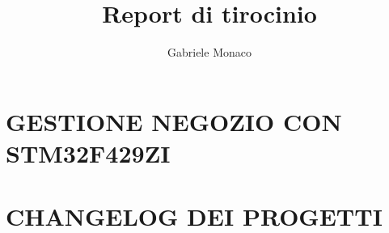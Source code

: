 \documentclass[a4paper,12pt]{article}
\title{Report di tirocinio}
\author{Gabriele Monaco}
\begin{document}
\maketitle

\newpage

\tableofcontents

\setlength{\parindent}{0pt}

\newcommand{\textdesc}[1]{\textsf{\color{teal}#1}}

\newpage
\section{GESTIONE NEGOZIO CON STM32F429ZI}


\newpage
\section{CHANGELOG DEI PROGETTI}

\end{document}
